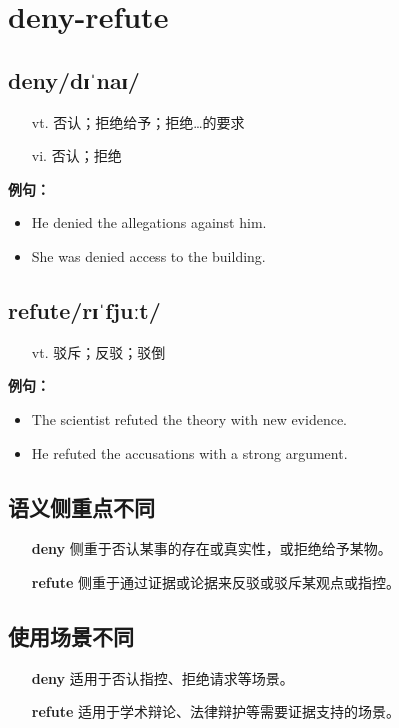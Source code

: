 \documentclass[12pt]{article}
\begin{document}
\section*{deny-refute}
\begin{multicols}{2}
\subsection*{\textbf{deny}\quad/dɪˈnaɪ/}
\begin{itemize}[leftmargin=2em]
\item[vt.] 否认；拒绝给予；拒绝…的要求
\item[vi.] 否认；拒绝
\end{itemize}
\textbf{例句：}
\begin{itemize}[leftmargin=2em]
\item He denied the allegations against him.
\item She was denied access to the building.
\end{itemize}
\subsection*{\textbf{refute}\quad/rɪˈfjuːt/}
\begin{itemize}[leftmargin=2em]
\item[vt.] 驳斥；反驳；驳倒
\end{itemize}
\textbf{例句：}
\begin{itemize}[leftmargin=2em]
\item The scientist refuted the theory with new evidence.
\item He refuted the accusations with a strong argument.
\end{itemize}
\end{multicols}
\subsection*{语义侧重点不同}
\begin{itemize}
\item[\textbf{deny}] 侧重于否认某事的存在或真实性，或拒绝给予某物。
\item[\textbf{refute}] 侧重于通过证据或论据来反驳或驳斥某观点或指控。
\end{itemize}
\subsection*{使用场景不同}
\begin{itemize}
\item[\textbf{deny}] 适用于否认指控、拒绝请求等场景。
\item[\textbf{refute}] 适用于学术辩论、法律辩护等需要证据支持的场景。
\end{itemize}
\end{document}
